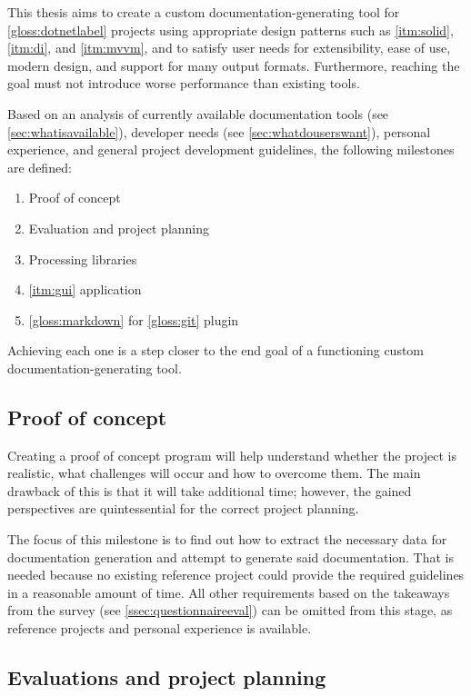 This thesis aims to create a custom documentation-generating tool for \ref{gloss:dotnetlabel} projects using appropriate design patterns such as \ref{itm:solid}, \ref{itm:di}, and \ref{itm:mvvm}, and to satisfy user needs for extensibility, ease of use, modern design, and support for many output formats. Furthermore, reaching the goal must not introduce worse performance than existing tools.

Based on an analysis of currently available documentation tools (see \ref{sec:whatisavailable}), developer needs (see \ref{sec:whatdouserswant}), personal experience, and general project development guidelines, the following milestones are defined:
\begin{enumerate}
    \item Proof of concept
    \item Evaluation and project planning
    \item Processing libraries
    \item \ref{itm:gui} application
    \item \ref{gloss:markdown} for \ref{gloss:git} plugin
\end{enumerate}

Achieving each one is a step closer to the end goal of a functioning custom documentation-generating tool.

\subsection*{Proof of concept} \label{subSecProofOfConcept}

Creating a proof of concept program will help understand whether the project is realistic, what challenges will occur and how to overcome them.
The main drawback of this is that it will take additional time; however, the gained perspectives are quintessential for the correct project planning.

The focus of this milestone is to find out how to extract the necessary data for documentation generation and attempt to generate said documentation.
That is needed because no existing reference project could provide the required guidelines in a reasonable amount of time.
All other requirements based on the takeaways from the survey (see \ref{ssec:questionnaireeval}) can be omitted from this stage, as reference projects and personal experience is available.

\subsection*{Evaluations and project planning} \label{subSecEvalProjPlanning}

